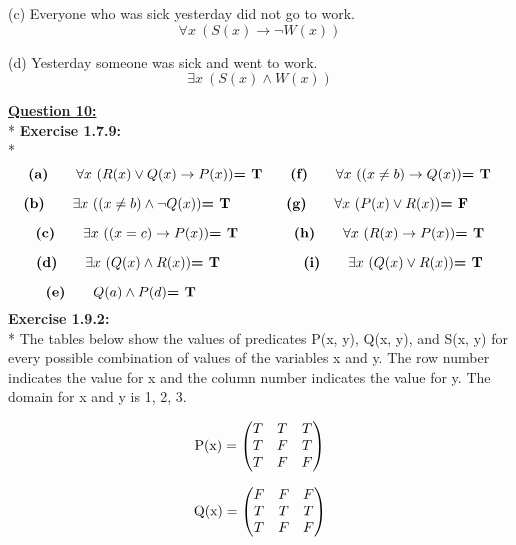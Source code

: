 \documentclass[12pt, letterpaper, twoside]{article}
\begin{document}
\noindent(c) Everyone who was sick yesterday did not go to work.
\[\forall x\ (S(x) \to \neg{W}(x))\]

\noindent(d) Yesterday someone was sick and went to work.
\[\exists x\ (S(x) \land W(x)) \]

\newpage
\noindent \underline{\textbf{Question 10:}}\\*
\noindent \textbf{Exercise 1.7.9:}\\*
\[\text{\textbf{(a)}} \qquad\forall x\ (R(x) \lor Q(x) \to P(x)) \text{\textbf{= T}} \qquad\text{\textbf{(f)}} \qquad\forall x\ ((x \neq b) \to Q(x)) \text{\textbf{= T}}\]

\[\text{\textbf{(b)}} \qquad\exists x\ ((x \neq b) \land \neg{Q}(x)) \text{\textbf{= T}}\qquad\qquad \text{\textbf{(g)}} \qquad \forall x\ (P(x) \lor R(x)) \text{\textbf{= F}}\qquad\]

\[\text{\textbf{(c)}} \qquad\exists x\ ((x = c) \to P(x)) \text{\textbf{= T}}\qquad\qquad\text{\textbf{(h)}} \qquad \forall x\ (R(x) \to P(x)) \text{\textbf{= T}}\]

\[\text{\textbf{(d)}} \qquad\exists x\ (Q(x) \land R(x)) \text{\textbf{= T}}\qquad\qquad\qquad\text{\textbf{(i)}} \qquad \exists x\ (Q(x) \lor R(x)) \text{\textbf{= T}}\]

\[\text{\textbf{(e)}} \qquad Q(a) \land P(d) \text{\textbf{= T}}\qquad\qquad\qquad\qquad\qquad\qquad\qquad\qquad\qquad\qquad\]
\break
\break
\noindent \textbf{Exercise 1.9.2:}\\*
The tables below show the values of predicates P(x, y), Q(x, y), and S(x, y) for every possible combination of values of the variables x and y. The row number indicates the value for x and the column number indicates the value for y. The domain for x and y is {1, 2, 3}.

\[
  \begin{array}{l@{{}={}}c}
  \text{P(x)} & \left(\begin{array}{@{}ccc@{}}
    T & T & T \\
    T & F & T \\
    T & F & F \\
  \end{array}\right)
  \end{array}
\]

\[
  \begin{array}{l@{{}={}}c}
  \text{Q(x)} & \left(\begin{array}{@{}ccc@{}}
    F & F & F \\
    T & T & T \\
    T & F & F \\
  \end{array}\right)
  \end{array}
\]
\end{document}
